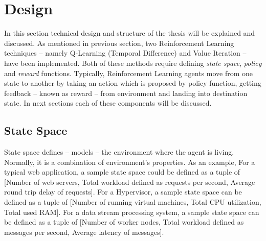 \section{Design}
\label{des:proj}

In this section technical design and structure of the thesis will be explained and discussed. As mentioned in previous section, two Reinforcement Learning techniques -- namely Q-Learning (Temporal Difference) and Value Iteration -- have been implemented. Both of these methods require defining \emph{state space}, \emph{policy} and \emph{reward} functions. Typically, Reinforcement Learning agents move from one state to another by taking an action which is proposed by policy function, getting feedback -- known as reward -- from environment and landing into destination state. In next sections each of these components will be discussed.

\subsection{State Space}
\label{des:state-space}

State space defines -- models -- the environment where the agent is living. Normally, it is a combination of environment's properties. As an example, For a typical web application, a sample state space could be defined as a tuple of [Number of web servers, Total workload defined as requests per second, Average round trip delay of requests]. For a Hypervisor, a sample state space can be defined as a tuple of [Number of running virtual machines, Total CPU utilization, Total used RAM]. For a data stream processing system, a sample state space can be defined as a tuple of [Number of worker nodes, Total workload defined as messages per second, Average latency of messages].

